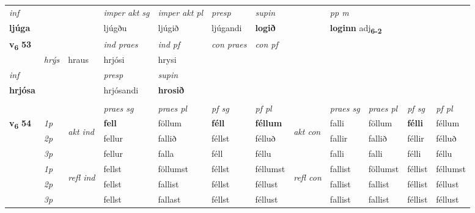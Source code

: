 \begin{longtable}[l]{X>{\footnotesize\itshape}llXXXXlXXXX}
   {\textit{inf}} & &  & \textit{imper akt sg} & \textit{imper akt pl}   & \textit{presp} & \textit{supin}  && \textit{pp m} \\*
  {\textbf{ljúga}} & && ljúgðu  & ljúgið   & ljúgandi &  \textbf{logið}  && \multicolumn{2}{l}{\textbf{loginn} adj\textbf{\textsubscript{6-2}}} \\*

\midrule

\multirow{2}{*}{{{\textbf{v{\textsubscript{6}}} \Large{\textbf{53}}}}}  &&&  \textit{ind praes} & \textit{ind pf} & \textit{con praes} & \textit{con pf} \\*
\multicolumn{3}{r}{\textit{e-m}} & hrýs & hraus & hrjósi & hrysi \\*

\cmidrule{4-7}
   {\textit{inf}} & &     & \textit{presp} & \textit{supin}   \\*
  {\textbf{hrjósa}} & &     & hrjósandi &  \textbf{hrosið}   \\*

\midrule
  & \\
   \midrule
 & &   & \textit{praes sg}  & \textit{praes pl}    & \textit{ pf sg} & \textit{pf pl} & & \textit{praes sg}  & \textit{praes pl}    & \textit{pf sg} & \textit{pf pl }  \\ \cmidrule{4-7} \cmidrule{9-12}
 \multirow{2}{*}{{{\textbf{v{\textsubscript{6}}} \Large{\textbf{54}}}}}  & 1p & \multirow{3}{*}{\begin{turn}{90}\textit{akt ind}\end{turn}} & \textbf{fell} & föllum & \textbf{féll} & \textbf{féllum} & \multirow{3}{*}{\begin{turn}{90}\textit{akt con}\end{turn}} &falli & föllum & \textbf{félli} & féllum\\*
 & 2p &  &  fellur  & fallið & féllst & félluð & & fallir & fallið & féllir & félluð \\*
 & 3p &  & fellur & falla & féll & féllu & & falli & falli& félli & féllu \\*
\cmidrule{4-7} \cmidrule{9-12}
 & 1p & \multirow{3}{*}{\begin{turn}{90}\textit{refl ind}\end{turn}}  & fellst & föllumst & féllst & féllumst & \multirow{3}{*}{\begin{turn}{90}\textit{refl con}\end{turn}}  &fallist & föllumst & féllist & féllumst \\*
 & 2p &  & fellst & fallist & féllst & féllust & &fallist & fallist & féllist & féllust \\*
 & 3p  & & fellst & fallast & féllst & féllust & & fallist & fallist& féllist & féllust \\*
\cmidrule{4-7} \cmidrule{9-12}


\end{longtable}
